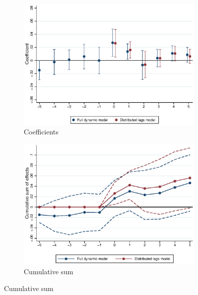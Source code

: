 \documentclass{article}
\begin{document}
\clearpage
\begin{figure}[htb!]
	\caption{Dynamic model}
	\centering
	\begin{subfigure}[b]{0.8\textwidth}
		\caption{Coefficients}
		\includegraphics[width = \textwidth]
		{../../analysis/first_differences/output/fd_models_coeffs_w5.eps}
	\end{subfigure}
	\begin{subfigure}[b]{0.8\textwidth}
		\caption{Cumulative sum}
		\includegraphics[width = \textwidth]
		{../../analysis/first_differences/output/fd_models_cumsum.eps}
	\end{subfigure}
\end{figure}
\end{document}
